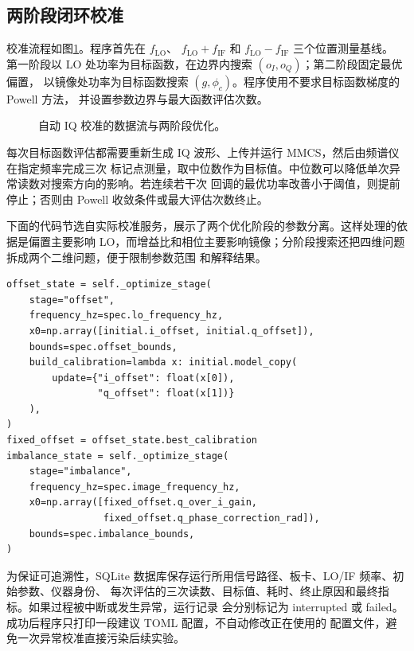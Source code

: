 \documentclass[UTF8,zihao=-4,a4paper]{ctexart}
\begin{document}
\subsection{两阶段闭环校准}

校准流程如图\ref{fig:calibration-flow}。程序首先在 $f_{\mathrm{LO}}$、
$f_{\mathrm{LO}}+f_{\mathrm{IF}}$ 和 $f_{\mathrm{LO}}-f_{\mathrm{IF}}$ 三个位置测量基线。
第一阶段以 LO 处功率为目标函数，在边界内搜索 $(o_I,o_Q)$；第二阶段固定最优偏置，
以镜像处功率为目标函数搜索 $(g,\phi_c)$。程序使用不要求目标函数梯度的 Powell 方法，
并设置参数边界与最大函数评估次数\cite{scipy_powell}。

\begin{figure}[htbp]
  \centering
  \resizebox{0.96\linewidth}{!}{}
  \caption{自动 IQ 校准的数据流与两阶段优化。}
  \label{fig:calibration-flow}
\end{figure}

每次目标函数评估都需要重新生成 IQ 波形、上传并运行 MMCS，然后由频谱仪在指定频率完成三次
标记点测量，取中位数作为目标值。中位数可以降低单次异常读数对搜索方向的影响。若连续若干次
回调的最优功率改善小于阈值，则提前停止；否则由 Powell 收敛条件或最大评估次数终止。

下面的代码节选自实际校准服务，展示了两个优化阶段的参数分离。这样处理的依据是偏置主要影响
LO，而增益比和相位主要影响镜像；分阶段搜索还把四维问题拆成两个二维问题，便于限制参数范围
和解释结果。

\begin{lstlisting}[caption={自动校准的两个优化阶段（省略重复参数）},label={lst:calibration}]
offset_state = self._optimize_stage(
    stage="offset",
    frequency_hz=spec.lo_frequency_hz,
    x0=np.array([initial.i_offset, initial.q_offset]),
    bounds=spec.offset_bounds,
    build_calibration=lambda x: initial.model_copy(
        update={"i_offset": float(x[0]),
                "q_offset": float(x[1])}
    ),
)
fixed_offset = offset_state.best_calibration
imbalance_state = self._optimize_stage(
    stage="imbalance",
    frequency_hz=spec.image_frequency_hz,
    x0=np.array([fixed_offset.q_over_i_gain,
                 fixed_offset.q_phase_correction_rad]),
    bounds=spec.imbalance_bounds,
)
\end{lstlisting}

为保证可追溯性，SQLite 数据库保存运行所用信号路径、板卡、LO/IF 频率、初始参数、仪器身份、
每次评估的三次读数、目标值、耗时、终止原因和最终指标。如果过程被中断或发生异常，运行记录
会分别标记为 interrupted 或 failed。成功后程序只打印一段建议 TOML 配置，不自动修改正在使用的
配置文件，避免一次异常校准直接污染后续实验。
\end{document}
